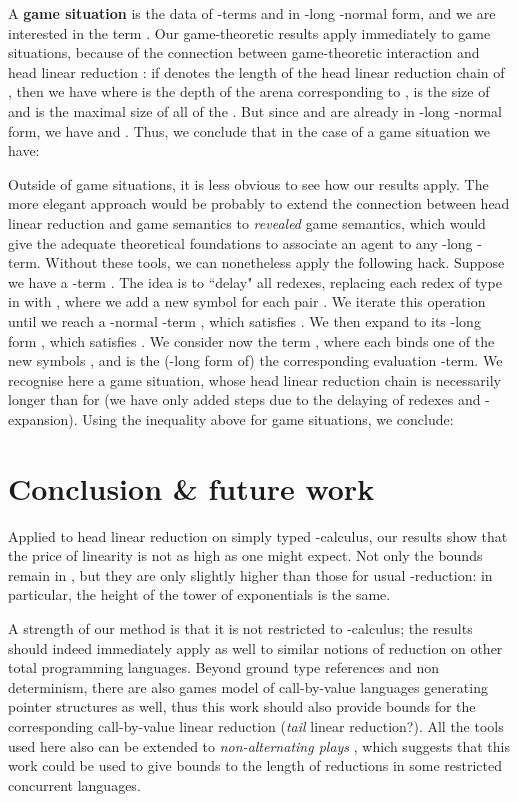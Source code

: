 \documentclass{article}
\begin{document}
A \textbf{game situation} \cite{phd} is the data of -terms  and  in -long -normal form, and we are interested
in the term .  Our game-theoretic results
apply immediately to game situations, because of the connection between game-theoretic interaction and head linear reduction \cite{danosregnier}:
if  denotes the length of the head linear reduction chain of , then we have 
 where
 is the depth of the arena corresponding to ,  is the size of  and  is the maximal size of all of the . But since  and  are already in -long
-normal form, we have  and . Thus, we conclude that in the case of a game situation we have:

Outside of game situations, it is less obvious to see how our results apply. The more elegant approach would be probably to extend the connection between head linear reduction
and game semantics to \emph{revealed} game semantics, which would give the adequate theoretical foundations to associate an agent to any -long -term. Without
these tools, we can nonetheless apply the following hack. Suppose we have a -term . The idea is to ``delay" all redexes, replacing each redex  of type  in  with 
, where we add a new symbol  for each pair . We iterate this operation until we reach a -normal -term , which satisfies .
We then expand  to its -long form , which satisfies . We consider now the term , 
where each  binds one of the new symbols , and  is the (-long form of) the corresponding evaluation -term. We recognise here a game situation, whose head linear
reduction chain is necessarily longer than for  (we have only added steps due to the delaying of redexes and -expansion). Using the inequality above for game situations, we conclude:


\section{Conclusion \& future work}

Applied to head linear reduction on simply typed -calculus, our results show that the price of linearity is not as high as one might expect. 
Not only the bounds remain in , but they are only slightly higher than those for usual -reduction: in particular, the height 
of the tower of exponentials is the same.

A strength of our method is that it is not restricted to -calculus; the results should indeed immediately apply as well to similar notions of reduction on other total
programming languages. Beyond ground type references and non determinism, there are also games model of call-by-value languages \cite{abramsky-mccusker:families} generating pointer structures as well, thus this work should also provide
bounds for the corresponding call-by-value linear reduction (\emph{tail} linear reduction?). All the tools used here also can be extended to \emph{non-alternating plays} \cite{DBLP:conf/concur/Laird05}, which suggests that this work could
be used to give bounds to the length of reductions in some restricted concurrent languages.
\end{document}
